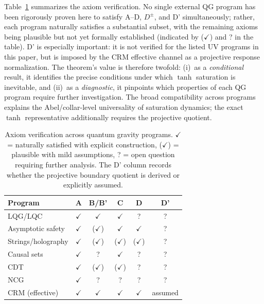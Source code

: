 \documentclass[aps,prd,twocolumn,superscriptaddress,nofootinbib]{revtex4-2}
\begin{document}
Table~\ref{tab:axiom_check} summarizes the axiom verification. No single external QG program has been rigorously proven here to satisfy A--D, $D^\pm$, and D' simultaneously; rather, each program naturally satisfies a substantial subset, with the remaining axioms being plausible but not yet formally established (indicated by ($\checkmark$) and ? in the table). D' is especially important: it is not verified for the listed UV programs in this paper, but is imposed by the CRM effective channel as a projective response normalization. The theorem's value is therefore twofold: (i)~as a \textit{conditional} result, it identifies the precise conditions under which $\tanh$ saturation is inevitable, and (ii)~as a \textit{diagnostic}, it pinpoints which properties of each QG program require further investigation. The broad compatibility across programs explains the Abel/collar-level universality of saturation dynamics; the exact $\tanh$ representative additionally requires the projective quotient.

\begin{table}[h]
\caption{Axiom verification across quantum gravity programs. $\checkmark$ = naturally satisfied with explicit construction, ($\checkmark$) = plausible with mild assumptions, ? = open question requiring further analysis. The D' column records whether the projective boundary quotient is derived or explicitly assumed.}
\label{tab:axiom_check}
\begin{ruledtabular}
\begin{tabular}{lccccc}
Program & A & B/B' & C & D & D' \\
\hline
LQG/LQC & $\checkmark$ & $\checkmark$ & $\checkmark$ & ? & ? \\
Asymptotic safety & $\checkmark$ & ($\checkmark$) & $\checkmark$ & $\checkmark$ & ? \\
Strings/holography & $\checkmark$ & ($\checkmark$) & ($\checkmark$) & ($\checkmark$) & ? \\
Causal sets & $\checkmark$ & ? & $\checkmark$ & ? & ? \\
CDT & $\checkmark$ & ($\checkmark$) & ($\checkmark$) & ? & ? \\
NCG & $\checkmark$ & ? & ? & ? & ? \\
CRM (effective) & $\checkmark$ & $\checkmark$ & $\checkmark$ & $\checkmark$ & assumed \\
\end{tabular}
\end{ruledtabular}
\end{table}
\end{document}
